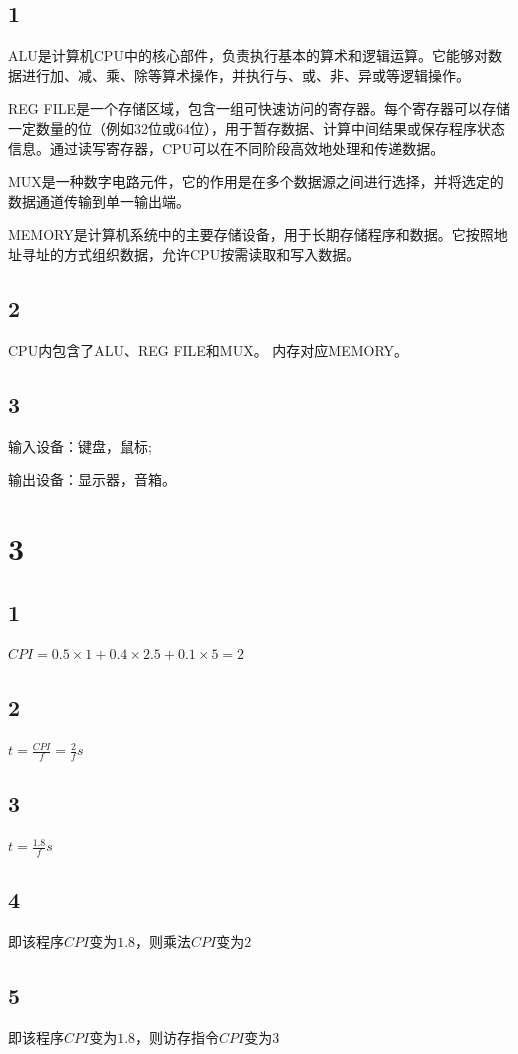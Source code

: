 \documentclass[12pt,a4paper]{ctexart}
\begin{document}
\subsection*{1}
ALU是计算机CPU中的核心部件，负责执行基本的算术和逻辑运算。它能够对数据进行加、减、乘、除等算术操作，并执行与、或、非、异或等逻辑操作。\par
REG FILE是一个存储区域，包含一组可快速访问的寄存器。每个寄存器可以存储一定数量的位（例如32位或64位），用于暂存数据、计算中间结果或保存程序状态信息。通过读写寄存器，CPU可以在不同阶段高效地处理和传递数据。\par
MUX是一种数字电路元件，它的作用是在多个数据源之间进行选择，并将选定的数据通道传输到单一输出端。\par
MEMORY是计算机系统中的主要存储设备，用于长期存储程序和数据。它按照地址寻址的方式组织数据，允许CPU按需读取和写入数据。\par
\subsection*{2}
CPU内包含了ALU、REG FILE和MUX。
内存对应MEMORY。
\subsection*{3}
输入设备：键盘，鼠标;\par
输出设备：显示器，音箱。
\section*{3}
\subsection*{1}
$CPI=0.5\times1+0.4\times2.5+0.1\times5=2$
\subsection*{2}
$t=\frac{CPI}{f}=\frac{2}{f}s$
\subsection*{3}
$t=\frac{1.8}{f}s$
\subsection*{4}
即该程序$CPI$变为$1.8$，则乘法$CPI$变为$2$
\subsection*{5}
即该程序$CPI$变为$1.8$，则访存指令$CPI$变为$3$
\end{document}
